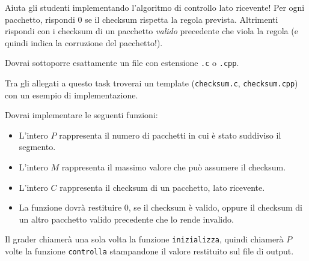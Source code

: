         Aiuta gli studenti implementando l'algoritmo di controllo lato ricevente! Per ogni pacchetto, rispondi $0$ se il checksum rispetta la regola prevista. Altrimenti rispondi con i checksum di un pacchetto \emph{valido} precedente che viola la regola (e quindi indica la corruzione del pacchetto!).



\Implementation


Dovrai sottoporre esattamente un file con estensione \texttt{.c} o \texttt{.cpp}.

\begin{warning}
Tra gli allegati a questo task troverai un template (\texttt{checksum.c}, \texttt{checksum.cpp}) con un esempio di implementazione.
\end{warning}

Dovrai implementare le seguenti funzioni:

\begin{itemize}[nolistsep]
	
	\begin{itemize}[nolistsep]
	  \item L'intero $P$ rappresenta il numero di pacchetti in cui è stato suddiviso il segmento.
	  \item L'intero $M$ rappresenta il massimo valore che può assumere il checksum.
          \item L'intero $C$ rappresenta il checksum di un pacchetto, lato ricevente.
          \item La funzione dovrà restituire $0$, se il checksum è valido, oppure il checksum di un altro pacchetto valido precedente che lo rende invalido.
        \end{itemize}
\end{itemize}

\medskip

Il grader chiamerà una sola volta la funzione \texttt{inizializza}, quindi chiamerà $P$ volte la funzione \texttt{controlla} stampandone il valore restituito sul file di output.



